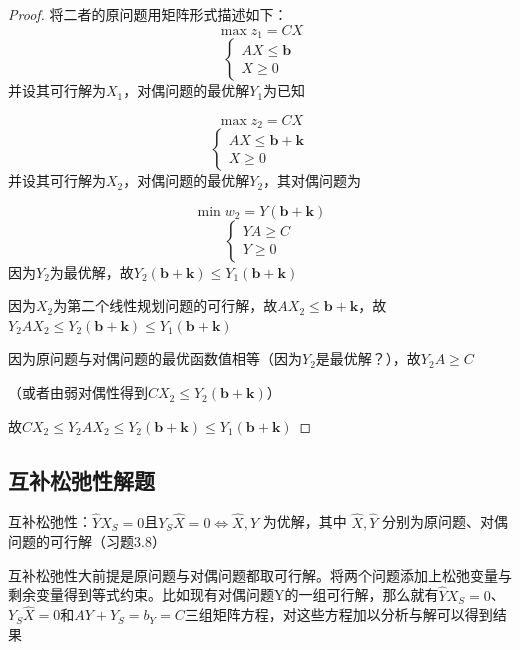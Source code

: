 \documentclass[]{report}
\begin{document}
		\begin{proof}
			将二者的原问题用矩阵形式描述如下：
			$$\max z_1=CX$$
			$$\begin{cases}
				AX\le\boldsymbol{b}\\
				X\ge0
			\end{cases}$$
			并设其可行解为$X_1$，对偶问题的最优解$Y_1$为已知\par
			$$\max z_2=CX$$
			$$\begin{cases}
				AX\le\boldsymbol{b}+\boldsymbol{k}\\
				X\ge0
			\end{cases}$$
			并设其可行解为$X_2$，对偶问题的最优解$Y_2$，其对偶问题为\par
			$$\min w_2=Y(\boldsymbol{b}+\boldsymbol{k})$$
			$$\begin{cases}
				YA\ge C\\
				Y\ge0
			\end{cases}$$
			因为$Y_2$为最优解，故$Y_2(\boldsymbol{b}+\boldsymbol{k})\le Y_1(\boldsymbol{b}+\boldsymbol{k})$\par
			因为$X_2$为第二个线性规划问题的可行解，故$AX_2\le\boldsymbol{b}+\boldsymbol{k}$，故$Y_2AX_2\le Y_2(\boldsymbol{b}+\boldsymbol{k})\le Y_1(\boldsymbol{b}+\boldsymbol{k})$\par
			因为原问题与对偶问题的最优函数值相等（因为$Y_2$是最优解？），故$Y_2A\ge C$\par
			（或者由弱对偶性得到$CX_2\le Y_2(\boldsymbol{b}+\boldsymbol{k})$）\par
			故$CX_2\le Y_2AX_2\le Y_2(\boldsymbol{b}+\boldsymbol{k})\le Y_1(\boldsymbol{b}+\boldsymbol{k})$
		\end{proof}

		\subsection{互补松弛性解题}
		互补松弛性：$\hat{Y}X_S=0$且$Y_S\hat{X}=0\Leftrightarrow\hat{X},\hat{Y}$ 为优解，其中 $\hat{X},\hat{Y}$ 分别为原问题、对偶问题的可行解（习题3.8）\par
		互补松弛性大前提是原问题与对偶问题都取可行解。将两个问题添加上松弛变量与剩余变量得到等式约束。比如现有对偶问题Y的一组可行解，那么就有$\hat{Y}X_S=0$、$Y_S\hat{X}=0$和$AY+Y_S=b_Y=C$三组矩阵方程，对这些方程加以分析与解可以得到结果
\end{document}
